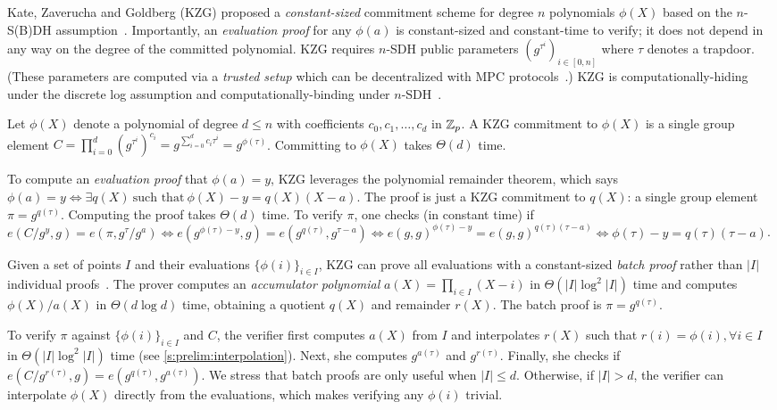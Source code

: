 Kate, Zaverucha and Goldberg (KZG) proposed a \textit{constant-sized} commitment scheme for degree $n$ polynomials $\phi(X)$ based on the $n$-S(B)DH assumption~\cite{BB08,Goyal07}.
Importantly, an \textit{evaluation proof} for any $\phi(a)$ is constant-sized and constant-time to verify; it does not depend in any way on the degree of the committed polynomial.
KZG requires $n$-SDH public parameters $(g^{\tau^i})_{i\in[0,n]}$ where $\tau$ denotes a trapdoor.
(These parameters are computed via a \textit{trusted setup} which can be decentralized with MPC protocols~\cite{BGG18,BGM17}.)
KZG is computationally-hiding under the discrete log assumption and computationally-binding under $n$-SDH~\cite{KZG10a}.

Let $\phi(X)$ denote a polynomial of degree $d\le n$ with coefficients $c_0, c_1, \dots, c_d$ in $\mathbb{Z}_p$.
A KZG commitment to $\phi(X)$ is a single group element $C = \prod_{i=0}^d {\left(g^{\tau^i}\right)^{c_i}} = g^{\sum_{i=0}^d c_i \tau^i} = g^{\phi(\tau)}$.
Committing to $\phi(X)$ takes $\Theta(d)$ time.

To compute an \textit{evaluation proof} that $\phi(a) = y$, KZG leverages the polynomial remainder theorem, which says $\phi(a) = y \Leftrightarrow \exists q(X)\ \text{such that}\ \phi(X) - y = q(X)(X-a)$.
The proof is just a KZG commitment to $q(X)$: a single group element $\pi=g^{q(\tau)}$.
Computing the proof takes $\Theta(d)$ time.
To verify $\pi$, one checks (in constant time) if
$
e(C / g^y, g)            = e(\pi, g^{\tau}/g^a) \Leftrightarrow
e(g^{\phi(\tau) - y}, g) = e(g^{q(\tau)},g^{\tau-a})\Leftrightarrow
e(g,g)^{\phi(\tau)-y}   = e(g,g)^{q(\tau)(\tau-a)} \Leftrightarrow
{\phi(\tau)-y}          = q(\tau)(\tau-a)
$.

Given a set of points $I$ and their evaluations $\{\phi(i)\}_{i\in I}$, KZG can prove all evaluations with a constant-sized \textit{batch proof} rather than $|I|$ individual proofs~\cite{KZG10a}.
The prover computes an \textit{accumulator polynomial} $a(X)=\prod_{i\in I} (X-i)$ in $\Theta(|I|\log^2{|I|})$ time and computes $\phi(X)/a(X)$ in $\Theta(d\log{d})$ time, obtaining a quotient $q(X)$ and remainder $r(X)$.
The batch proof is $\pi=g^{q(\tau)}$.

To verify $\pi$ against $\{\phi(i)\}_{i\in I}$ and $C$, the verifier first computes $a(X)$ from $I$ and interpolates $r(X)$ such that $r(i)=\phi(i), \forall i \in I$ in $\Theta(|I|\log^2{|I|})$ time (see \cref{s:prelim:interpolation}).
Next, she computes $g^{a(\tau)}$ and $g^{r(\tau)}$.
Finally, she checks if $e(C / g^{r(\tau)}, g) = e(g^{q(\tau)}, g^{a(\tau)})$.
We stress that batch proofs are only useful when $|I| \le d$.
Otherwise, if $|I| > d$, the verifier can interpolate $\phi(X)$ directly from the evaluations, which makes verifying any $\phi(i)$ trivial.

